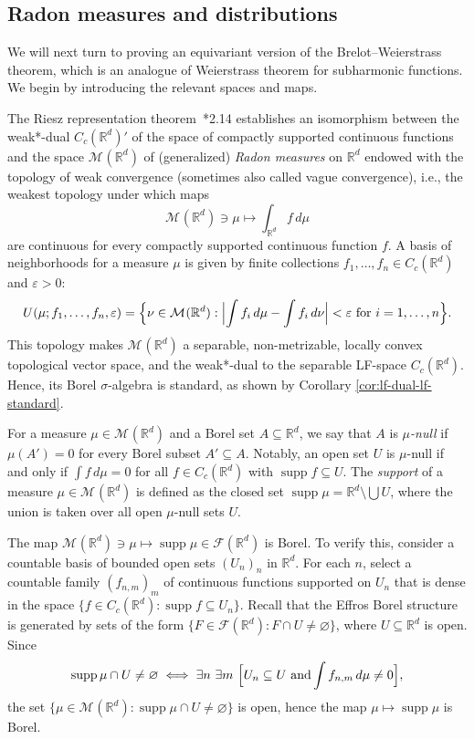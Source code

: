 \documentclass[12pt]{paper}
\numberwithin{equation}{section}
\theoremstyle{plain}
\theoremstyle{definition}
\newcommand{\Rd}{\mathbb{R}^{d}}
\newcommand{\effros}[1]{\mathcal{F}(#1)}
\newcommand{\contcs}[1]{C_{c}(#1)}
\newcommand{\meas}[2][]{\mathcal{M}_{#1}(#2)}
\DeclareMathOperator*{\supp}{\mathrm{supp}}
\renewcommand{\epsilon}{\varepsilon}
\begin{document}
\subsection{Radon measures and distributions}
\label{sec:radon-meas-distrib}
We will next turn to proving an equivariant version of the Brelot--Weierstrass theorem, which is an
analogue of Weierstrass theorem for subharmonic functions. We begin by introducing the relevant
spaces and maps.

The Riesz representation theorem~\cite{rudinRealComplexAnalysis1987}*{2.14} establishes an
isomorphism between the weak*-dual \(\contcs{\Rd}'\) of the space of compactly supported continuous
functions and the space \(\meas{\Rd}\) of (generalized) \emph{Radon measures} on \(\Rd\) endowed
with the topology of weak convergence (sometimes also called vague convergence), i.e., the weakest
topology under which maps
\[
\meas{\Rd} \ni \mu \mapsto \int_{\Rd} f\, d\mu
\]
are continuous for every compactly supported continuous function \(f\).  A basis of neighborhoods
for a measure \(\mu\) is given by finite collections \(f_{1}, \ldots, f_{n} \in \contcs{\Rd}\) and
\(\epsilon > 0\):
\[U(\mu; f_{1}, \ldots, f_{n}, \epsilon) = \Bigl\{\nu \in \meas{\Rd} : \Bigl| \int f_{i}\, d\mu -
  \int f_{i}\, d\nu \Bigr| < \epsilon \textrm{ for } i = 1, \ldots, n\Bigr\}.\]
This topology makes \(\meas{\Rd}\) a separable, non-metrizable, locally convex topological vector
space, and the weak*-dual to the separable LF-space \(\contcs{\Rd}\).  Hence, its Borel
\(\sigma\)-algebra is standard, as shown by Corollary \ref{cor:lf-dual-lf-standard}.

For a measure \(\mu \in \meas{\Rd}\) and a Borel set \(A \subseteq \Rd\), we say that \(A\) is
\emph{\(\mu\)-null} if \(\mu(A') = 0\) for every Borel subset \(A' \subseteq A\).  Notably, an open
set \(U\) is \(\mu\)-null if and only if \(\int f\, d\mu = 0\) for all \(f \in \contcs{\Rd}\) with
\(\supp f \subseteq U\).  The \emph{support} of a measure \(\mu \in \meas{\Rd}\) is defined as the
closed set \(\supp \mu = \Rd \setminus \bigcup U\), where the union is taken over all open
\(\mu\)-null sets \(U\).

The map \(\meas{\Rd} \ni \mu \mapsto \supp \mu \in \effros{\Rd}\) is Borel.  To verify this,
consider a countable basis of bounded open sets \((U_{n})_{n}\) in \(\Rd\).  For each \(n\), select
a countable family \((f_{n,m})_{m}\) of continuous functions supported on \(U_{n}\) that is dense in
the space \(\{f \in \contcs{\Rd} : \supp f \subseteq U_{n}\}\).  Recall that the Effros Borel
structure is generated by sets of the form \(\{F \in \effros{\Rd} : F \cap U \ne \varnothing\}\),
where \(U \subseteq \Rd\) is open.  Since
\[\supp \mu \cap U \ne \varnothing \iff \exists n\ \exists m\ \Bigl[U_{n} \subseteq U \textrm{ and}
  \int f_{n,m}\, d\mu \ne 0\Bigr], \]
the set \(\{\mu \in \meas{\Rd}: \supp \mu \cap U \ne \varnothing\}\) is open, hence the map
\(\mu \mapsto \supp \mu\) is Borel.
\end{document}
